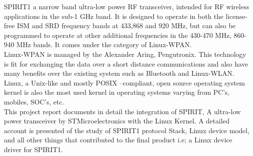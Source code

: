 \begin{Large}
\end{Large}

\vskip 0.1in
\noindent SPIRIT1 a narrow band ultra-low power RF transceiver, intended for RF wireless applications in the sub-1 GHz band. It is designed to operate in both the license-free ISM and SRD frequency bands at 433,868 and 920 MHz, but can also be programmed to operate at other additional frequencies in the 430-470 MHz, 860-940 MHz bands. It comes under the category of Linux-WPAN.\\
 Linux-WPAN is managed by the Alexander Aring, Pengutronix. This technology is fit for exchanging the data over a short distance communications and also have many benefits over the existing system such as Bluetooth and Linux-WLAN. \\ 
\noindent Linux, a Unix-like and mostly POSIX –compliant, open source operating system kernel is also the most used kernel in operating systems varying from PC’s, mobiles, SOC’s, etc.\\
\noindent This project report documents in detail the integration of SPIRIT, A ultra-low power transceiver by STMicroelectronics with the Linux Kernel. A detailed account is presented of the study of SPIRIT1 protocol Stack, Linux device model, and all other things that contributed to the final product i.e; a Linux device driver for SPIRIT1.
